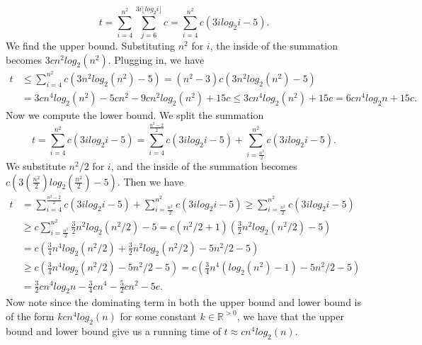 \documentclass[10pt,oneside,reqno]{amsart}
\theoremstyle{plain}
\theoremstyle{definition}
\begin{document}
\begin{enumerate}[label=2.]
\begin{enumerate}
\[t = \sum_{i = 4}^{n^2} \sum_{j = 6}^{3i\lfloor log_2i \rfloor} c = \sum_{i = 4}^{n^2} c(3ilog_2i - 5).\]
We find the upper bound. Substituting $n^2$ for $i$, the inside of the summation becomes $3cn^2log_2(n^2)$. Plugging in, we have
\begin{equation}
\begin{aligned}
t &\leq \sum_{i = 4}^{n^2} c(3n^2log_2(n^2) - 5) = (n^2 -3)c(3n^2log_2(n^2) - 5) \\ &= 3cn^4log_2(n^2) -5cn^2 -9cn^2log_2(n^2) + 15c
 \leq 3cn^4log_2(n^2) + 15c = 6cn^4log_2n + 15c. 
\end{aligned}
\end{equation}
Now we compute the lower bound. We split the summation
\[t = \sum_{i = 4}^{n^2} c(3ilog_2i - 5) = \sum_{i = 4}^{\frac{n^2 - 2}{2}} c(3ilog_2i - 5) + \sum_{i = \frac{n^2}{2}}^{n^2} c(3ilog_2i - 5). \]
We substitute $n^2/2$ for $i$, and the inside of the summation becomes $c(3(\frac{n^2}{2})log_2(\frac{n^2}{2}) - 5)$. Then we have
\begin{equation}
\begin{aligned}
t  &= \sum_{i = 4}^{\frac{n^2 - 2}{2}} c(3ilog_2i - 5) + \sum_{i = \frac{n^2}{2}}^{n^2} c(3ilog_2i - 5) \geq \sum_{i = \frac{n^2}{2}}^{n^2} c(3ilog_2i - 5) \\&\geq c\sum_{i = \frac{n^2}{2}}^{n^2} \frac{3}{2}n^2log_2(n^2/2) - 5 = c(n^2/2 + 1)\left(\frac{3}{2}n^2log_2(n^2/2) - 5 \right)\\
&= c\left(\frac{3}{4}n^4log_2(n^2/2) + \frac{3}{2}n^2log_2(n^2/2) -5n^2/2 - 5\right)\\
&\geq c\left(\frac{3}{4}n^4log_2(n^2/2)  -5n^2/2 - 5\right) = c\left(\frac{3}{4}n^4(log_2(n^2) - 1)  -5n^2/2 - 5\right)\\
&= \frac{3}{2}cn^4log_2n - \frac{3}{4}cn^4 - \frac{5}{2}cn^2 - 5c.
\end{aligned}
\end{equation}
Now note since the dominating term in both the upper bound and lower bound is of the form $kcn^4log_2(n)$ for some constant $k \in \mathbb{R}^{> 0}$, we have that the upper bound and lower bound give us a running time of $t \approx cn^4log_2(n)$. 




\end{enumerate}

\end{enumerate}
\end{document}
